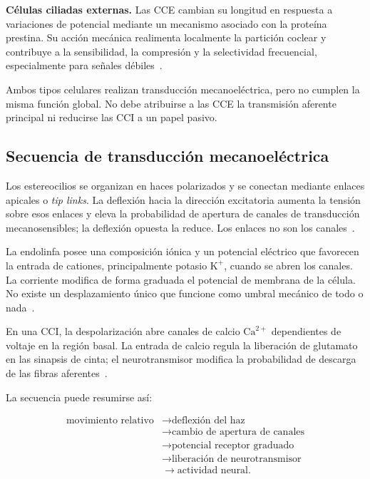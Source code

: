 \textbf{Células ciliadas externas.} Las CCE cambian su longitud en
respuesta a variaciones de potencial mediante un mecanismo asociado con la
proteína prestina. Su acción mecánica realimenta localmente la partición
coclear y contribuye a la sensibilidad, la compresión y la selectividad
frecuencial, especialmente para señales débiles~\cite{fettiplace2017,capraraPeng2022}.

Ambos tipos celulares realizan transducción mecanoeléctrica, pero no cumplen
la misma función global. No debe atribuirse a las CCE la transmisión aferente
principal ni reducirse las CCI a un papel pasivo.

\subsection{Secuencia de transducción mecanoeléctrica}
\label{sec:u6-transduccion}

Los estereocilios se organizan en haces polarizados y se conectan
mediante enlaces apicales o \emph{tip links}. La deflexión hacia la dirección
excitatoria aumenta la tensión sobre esos enlaces y eleva la probabilidad de
apertura de canales de transducción mecanosensibles; la deflexión opuesta la
reduce. Los enlaces no son los canales~\cite{fettiplace2017,capraraPeng2022}.

La endolinfa posee una composición iónica y un potencial eléctrico
que favorecen la entrada de cationes, principalmente potasio
\(\text{K}^{+}\), cuando se abren los canales. La corriente modifica de forma
graduada el potencial de membrana de la célula. No existe un desplazamiento
único que funcione como umbral mecánico de todo o nada~\cite{fettiplace2017,capraraPeng2022}.

En una CCI, la despolarización abre canales de calcio
\(\text{Ca}^{2+}\) dependientes de voltaje en la región basal. La entrada de
calcio regula la liberación de glutamato en las sinapsis de cinta; el
neurotransmisor modifica la probabilidad de descarga de las fibras
aferentes~\cite{fettiplace2017,capraraPeng2022}.

La secuencia puede resumirse así:

\[
\begin{aligned}
\text{movimiento relativo}
&\longrightarrow \text{deflexión del haz}\\
&\longrightarrow \text{cambio de apertura de canales}\\
&\longrightarrow \text{potencial receptor graduado}\\
&\longrightarrow \text{liberación de neurotransmisor}\\
&\longrightarrow \text{actividad neural}.
\end{aligned}
\]

